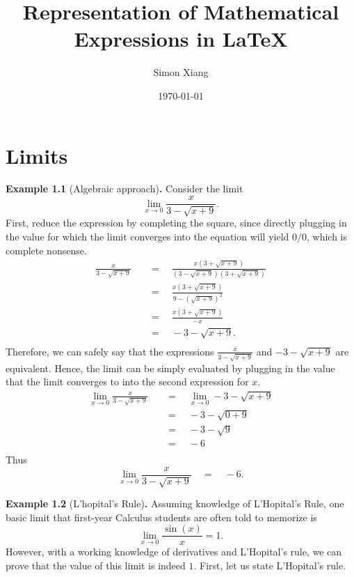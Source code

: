\documentclass{article}
\title{Representation of Mathematical Expressions in \LaTeX}
\author{Simon Xiang}
\date{\today}
\theoremstyle{definition}
\begin{document}
\maketitle

\section{Limits}

\textbf{Example 1.1 }(Algebraic approach)\textbf{.} Consider the limit
\begin{equation*}
    \lim_{x \to 0} \frac{x}{3-\sqrt{x+9}}.
\end{equation*}
First, reduce the expression by completing the square, since directly plugging in the value for which
the limit converges into the equation will yield $0/0$, which is complete nonsense. 
\begin{equation*}
\begin{split}
    \frac{x}{3-\sqrt{x+9}}\quad&=\quad\frac{x(3+\sqrt{x+9})}{(3-\sqrt{x+9})(3+\sqrt{x+9})}\\
    &=\quad\frac{x(3+\sqrt{x+9})}{9-(\sqrt{x+9})^2}\\
    &=\quad\frac{x(3+\sqrt{x+9})}{-x}\\
    &=\quad-3-\sqrt{x+9}.\\
\end{split}
\end{equation*}
Therefore, we can safely say that the expressions $\frac{x}{3-\sqrt{x+9}}$ and $-3-\sqrt{x+9}$
are equivalent. Hence, the limit can be simply evaluated by plugging in the value that the limit
converges to into the second expression for $x$.
\begin{equation*}
\begin{split}
    \lim_{x \to 0} \frac{x}{3-\sqrt{x+9}}\quad&=\quad\lim_{x \to 0} -3-\sqrt{x+9}\\
    &=\quad-3-\sqrt{0+9}\\
    &=\quad-3-\sqrt{9}\\
    &=\quad-6\\
\end{split}
\end{equation*}
Thus
\begin{equation*}
    \lim_{x \to 0} \frac{x}{3-\sqrt{x+9}}\quad=\quad-6.
\end{equation*}

\noindent\textbf{Example 1.2 }(L'hopital's Rule)\textbf{.}
Assuming knowledge of L'Hopital's Rule, one basic limit that first-year Calculus students
are often told to memorize is
\begin{equation*}
    \lim_{x \to 0} \frac{\sin (x)}{x} = 1.
\end{equation*}
However, with a working knowledge of derivatives and L'Hopital's rule, we can prove that 
the value of this limit is indeed $1$. First, let us state L'Hopital's rule.
\end{document}
